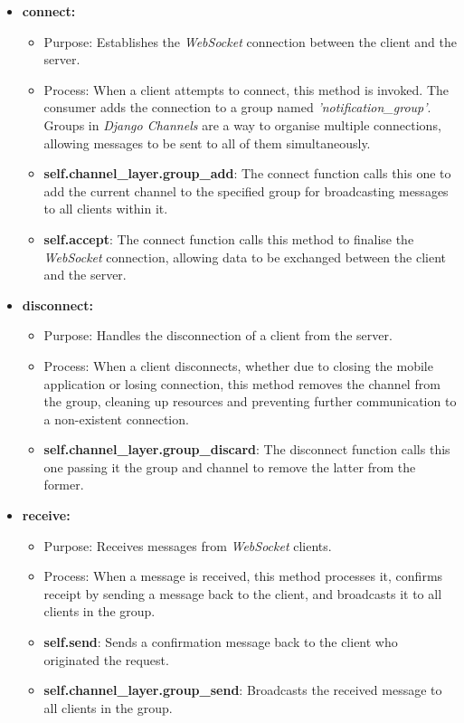 \begin{itemize}
    \item \textbf{connect:}
    \begin{itemize}
        \item Purpose: Establishes the \textit{WebSocket} connection between the client and the server.
        \item Process: When a client attempts to connect, this method is invoked. The consumer adds the connection to a group named \textit{'notification\_group'}. Groups in \textit{Django Channels} are a way to organise multiple connections, allowing messages to be sent to all of them simultaneously.
        \item \textbf{self.channel\_layer.group\_add}: The connect function calls this one to add the current channel to the specified group for broadcasting messages to all clients within it.
        \item \textbf{self.accept}: The connect function calls this method to finalise the \textit{WebSocket} connection, allowing data to be exchanged between the client and the server.
    \end{itemize}

    \item \textbf{disconnect:}
    \begin{itemize}
        \item Purpose: Handles the disconnection of a client from the server.
        \item Process: When a client disconnects, whether due to closing the mobile application or losing connection, this method removes the channel from the group, cleaning up resources and preventing further communication to a non-existent connection.
        \item \textbf{self.channel\_layer.group\_discard}: The disconnect function calls this one passing it the group and channel to remove the latter from the former.
    \end{itemize}

    \item \textbf{receive:}
    \begin{itemize}
        \item Purpose: Receives messages from \textit{WebSocket} clients.
        \item Process: When a message is received, this method processes it, confirms receipt by sending a message back to the client, and broadcasts it to all clients in the group.
        \item \textbf{self.send}: Sends a confirmation message back to the client who originated the request.
        \item \textbf{self.channel\_layer.group\_send}: Broadcasts the received message to all clients in the group.
    \end{itemize}


\end{itemize}
